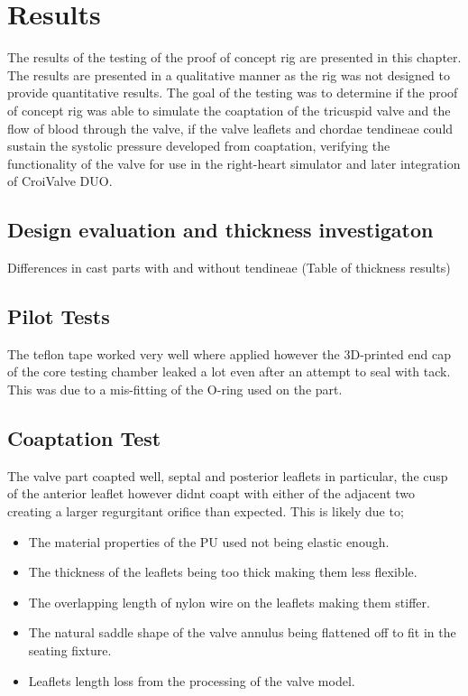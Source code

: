 \chapter{Results}\label{ch:results}
The results of the testing of the proof of concept rig are presented in this chapter. The results are presented in a qualitative manner as the rig was not designed to provide quantitative results.
The goal of the testing was to determine if the proof of concept rig was able to simulate the coaptation of the tricuspid valve and the flow of blood through the valve, if the valve leaflets and chordae tendineae could sustain the systolic pressure developed from coaptation, verifying the functionality of the valve for use in the right-heart simulator and later integration of CroiValve DUO.
\section{Design evaluation and thickness investigaton}
Differences in cast parts with and without tendineae
(Table of thickness results)

\section{Pilot Tests}
The teflon tape worked very well where applied however the 3D-printed end cap of the core testing chamber leaked a lot even after an attempt to seal with tack. This was due to a mis-fitting of the O-ring used on the part.

\section{Coaptation Test}
The valve part coapted well, septal and posterior leaflets in particular, the cusp of the anterior leaflet however didnt coapt with either of the adjacent two creating a larger regurgitant orifice than expected. This is likely due to;
\begin{itemize}
    \item The material properties of the \gls{PU} used not being elastic enough.
    \item The thickness of the leaflets being too thick making them less flexible.
    \item The overlapping length of nylon wire on the leaflets making them stiffer.
    \item The natural saddle shape of the valve annulus being flattened off to fit in the seating fixture.
    \item Leaflets length loss from the processing of the valve model.
\end{itemize}

